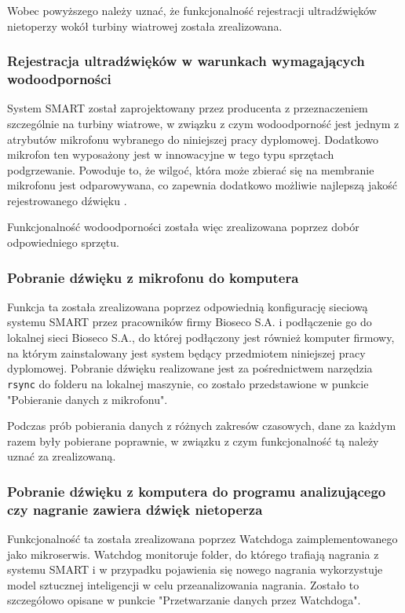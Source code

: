 \documentclass{sprz}
\begin{document}
Wobec powyższego należy uznać, że funkcjonalność rejestracji ultradźwięków nietoperzy wokół turbiny wiatrowej została zrealizowana.

\subsubsection{Rejestracja ultradźwięków w warunkach wymagających wodoodporności}
System SMART został zaprojektowany przez producenta z przeznaczeniem szczególnie na turbiny wiatrowe, w związku z czym wodoodporność jest jednym z atrybutów mikrofonu wybranego do niniejszej pracy dyplomowej. Dodatkowo mikrofon ten wyposażony jest w innowacyjne w tego typu sprzętach podgrzewanie. Powoduje to, że wilgoć, która może zbierać się na membranie mikrofonu jest odparowywana, co zapewnia dodatkowo możliwie najlepszą jakość rejestrowanego dźwięku \cite{smart-user-guide}. 

Funkcjonalność wodoodporności została więc zrealizowana poprzez dobór odpowiedniego sprzętu.

\subsubsection{Pobranie dźwięku z mikrofonu do komputera}
Funkcja ta została zrealizowana poprzez odpowiednią konfigurację sieciową systemu SMART przez pracowników firmy Bioseco S.A. i podłączenie go do lokalnej sieci Bioseco S.A., do której podłączony jest również komputer firmowy, na którym zainstalowany jest system będący przedmiotem niniejszej pracy dyplomowej. Pobranie dźwięku realizowane jest za pośrednictwem narzędzia \verb|rsync| do folderu na lokalnej maszynie, co zostało przedstawione w punkcie "Pobieranie danych z mikrofonu". 

Podczas prób pobierania danych z różnych zakresów czasowych, dane za każdym razem były pobierane poprawnie, w związku z czym funkcjonalność tą należy uznać za zrealizowaną.

\subsubsection{Pobranie dźwięku z komputera do programu analizującego czy nagranie zawiera dźwięk nietoperza}

Funkcjonalność ta została zrealizowana poprzez Watchdoga zaimplementowanego jako mikroserwis. Watchdog monitoruje folder, do którego trafiają nagrania z systemu SMART i w przypadku pojawienia się nowego nagrania wykorzystuje model sztucznej inteligencji w celu przeanalizowania nagrania. Zostało to szczegółowo opisane w punkcie "Przetwarzanie danych przez Watchdoga". 
\end{document}
